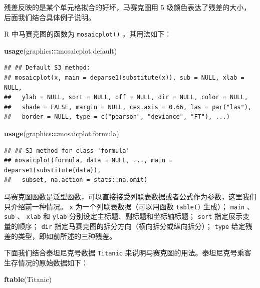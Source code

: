 \documentclass[
  b5paper,
  UTF8,twoside]{book}
\newenvironment{Shaded}{\begin{snugshade}}{\end{snugshade}}
\newcommand{\FunctionTok}[1]{\textcolor[rgb]{0.13,0.29,0.53}{\textbf{#1}}}
\newcommand{\NormalTok}[1]{#1}
\newcommand{\SpecialCharTok}[1]{\textcolor[rgb]{0.81,0.36,0.00}{\textbf{#1}}}
\begin{document}
残差反映的是某个单元格拟合的好坏，马赛克图用 5 级颜色表达了残差的大小，后面我们结合具体例子说明。

R 中马赛克图的函数为 \texttt{mosaicplot()} ，其用法如下：

\begin{Shaded}
\begin{Highlighting}[]
\FunctionTok{usage}\NormalTok{(graphics}\SpecialCharTok{:::}\NormalTok{mosaicplot.default)}
\end{Highlighting}
\end{Shaded}

\begin{verbatim}
## ## Default S3 method:
## mosaicplot(x, main = deparse1(substitute(x)), sub = NULL, xlab = NULL,
##   ylab = NULL, sort = NULL, off = NULL, dir = NULL, color = NULL,
##   shade = FALSE, margin = NULL, cex.axis = 0.66, las = par("las"),
##   border = NULL, type = c("pearson", "deviance", "FT"), ...)
\end{verbatim}

\begin{Shaded}
\begin{Highlighting}[]
\FunctionTok{usage}\NormalTok{(graphics}\SpecialCharTok{:::}\NormalTok{mosaicplot.formula)}
\end{Highlighting}
\end{Shaded}

\begin{verbatim}
## ## S3 method for class 'formula'
## mosaicplot(formula, data = NULL, ..., main = deparse1(substitute(data)),
##   subset, na.action = stats::na.omit)
\end{verbatim}

马赛克图函数是泛型函数，可以直接接受列联表数据或者公式作为参数，这里我们只介绍前一种情况。 \texttt{x} 为一个列联表数据（可以用函数 \texttt{table()} 生成）； \texttt{main} 、 \texttt{sub} 、 \texttt{xlab} 和 \texttt{ylab} 分别设定主标题、副标题和坐标轴标题； \texttt{sort} 指定展示变量的顺序； \texttt{dir} 指定马赛克图的拆分方向（横向拆分或纵向拆分）； \texttt{type} 给定残差的类型，即如前所述的三种残差。

下面我们结合泰坦尼克号数据 \texttt{Titanic} 来说明马赛克图的用法。泰坦尼克号乘客生存情况的原始数据如下：

\begin{Shaded}
\begin{Highlighting}[]
\FunctionTok{ftable}\NormalTok{(Titanic)}
\end{Highlighting}
\end{Shaded}
\end{document}
